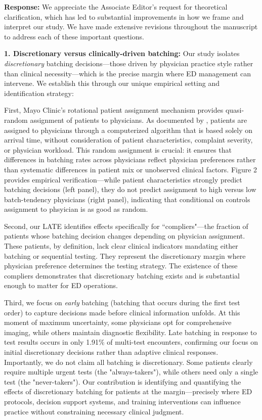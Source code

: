 \documentclass[11pt]{article}
\newcommand{\1}{\hbox{\rm 1\kern-.35em 1}}
\begin{document}
\noindent\textbf{Response:} 
\color{blue}
We appreciate the Associate Editor's request for theoretical clarification, which has led to substantial improvements in how we frame and interpret our study. We have made extensive revisions throughout the manuscript to address each of these important questions.

\textbf{1. Discretionary versus clinically-driven batching:} Our study isolates \textit{discretionary} batching decisions—those driven by physician practice style rather than clinical necessity—which is the precise margin where ED management can intervene. We establish this through our unique empirical setting and identification strategy:

First, Mayo Clinic's rotational patient assignment mechanism provides quasi-random assignment of patients to physicians. As documented by \cite{Traub2016, traub2016emergency, Traub2018}, patients are assigned to physicians through a computerized algorithm that is based solely on arrival time, without consideration of patient characteristics, complaint severity, or physician workload. This random assignment is crucial: it ensures that differences in batching rates across physicians reflect physician preferences rather than systematic differences in patient mix or unobserved clinical factors. Figure 2 provides empirical verification—while patient characteristics strongly predict batching decisions (left panel), they do not predict assignment to high versus low batch-tendency physicians (right panel), indicating that conditional on controls assignment to phsyician is as good as random.

Second, our LATE identifies effects specifically for ``compliers"—the fraction of patients whose batching decision changes depending on physician assignment. These patients, by definition, lack clear clinical indicators mandating either batching or sequential testing. They represent the discretionary margin where physician preference determines the testing strategy. The existence of these compliers demonstrates that discretionary batching exists and is substantial enough to matter for ED operations.

Third, we focus on \textit{early} batching (batching that occurs during the first test order) to capture decisions made before clinical information unfolds. At this moment of maximum uncertainty, some physicians opt for comprehensive imaging, while others maintain diagnostic flexibility. Late batching in response to test results occurs in only 1.91\% of multi-test encounters, confirming our focus on initial discretionary decisions rather than adaptive clinical responses.
Importantly, we do not claim all batching is discretionary. Some patients clearly require multiple urgent tests (the "always-takers"), while others need only a single test (the "never-takers"). Our contribution is identifying and quantifying the effects of discretionary batching for patients at the margin—precisely where ED protocols, decision support systems, and training interventions can influence practice without constraining necessary clinical judgment.
\end{document}
